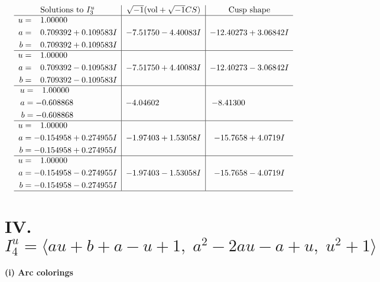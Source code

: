 \documentclass[1p]{elsarticle_modified}
\theoremstyle{definition}
\newcommand{\I}{\sqrt{-1}}
\begin{document}
$$\begin{array}{c|c|c}  
\text{Solutions to }I^u_{3}& \I (\text{vol} + \sqrt{-1}CS) & \text{Cusp shape}\\
 \hline 
\begin{aligned}
u &= \phantom{-}1.00000\phantom{ +0.000000I} \\
a &= \phantom{-}0.709392 + 0.109583 I \\
b &= \phantom{-}0.709392 + 0.109583 I\end{aligned}
 & -7.51750 - 4.40083 I & -12.40273 + 3.06842 I \\ \hline\begin{aligned}
u &= \phantom{-}1.00000\phantom{ +0.000000I} \\
a &= \phantom{-}0.709392 - 0.109583 I \\
b &= \phantom{-}0.709392 - 0.109583 I\end{aligned}
 & -7.51750 + 4.40083 I & -12.40273 - 3.06842 I \\ \hline\begin{aligned}
u &= \phantom{-}1.00000\phantom{ +0.000000I} \\
a &= -0.608868\phantom{ +0.000000I} \\
b &= -0.608868\phantom{ +0.000000I}\end{aligned}
 & -4.04602\phantom{ +0.000000I} & -8.41300\phantom{ +0.000000I} \\ \hline\begin{aligned}
u &= \phantom{-}1.00000\phantom{ +0.000000I} \\
a &= -0.154958 + 0.274955 I \\
b &= -0.154958 + 0.274955 I\end{aligned}
 & -1.97403 + 1.53058 I & -15.7658 + 4.0719 I \\ \hline\begin{aligned}
u &= \phantom{-}1.00000\phantom{ +0.000000I} \\
a &= -0.154958 - 0.274955 I \\
b &= -0.154958 - 0.274955 I\end{aligned}
 & -1.97403 - 1.53058 I & -15.7658 - 4.0719 I\\
 \hline 
 \end{array}$$\newpage\newpage\renewcommand{\arraystretch}{1}
\centering \section*{IV. $I^u_{4}= \langle a u+b+a- u+1,\;a^2-2 a u- a+u,\;u^2+1 \rangle$}
\flushleft \textbf{(i) Arc colorings}\\
\end{document}
